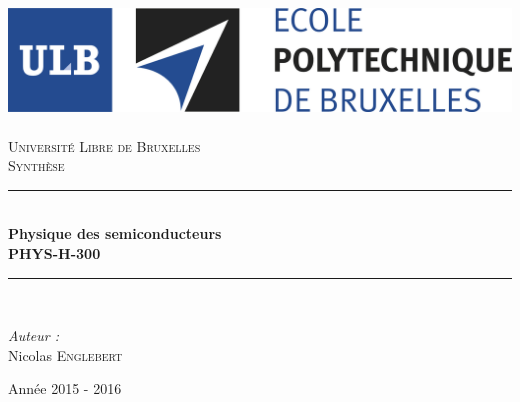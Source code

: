 \AddToShipoutPicture*{\BackgroundPic}
\begin{titlepage}
\begin{center}	
	
	\newcommand{\HRule}{\rule{\linewidth}{0.5mm}}   			            %
	\includegraphics[scale=0.11]{titlepage/logo.jpg}~\\[1cm]				%

	\textsc{\LARGE Université Libre de Bruxelles}\\[1.5cm]
	\textsc{\Large Synthèse}\\[0.5cm]

	\HRule \\[0.4cm]
	{ \huge \bfseries Physique des semiconducteurs \ \\PHYS-H-300 \\[0.4cm] }


	\HRule \\[1.5cm]
		\begin{minipage}{0.4\textwidth}
		\begin{flushleft} \large
		
		\emph{Auteur :}\\
			Nicolas \textsc{Englebert}

			\end{flushleft}
			\end{minipage}
			\begin{minipage}{0.4\textwidth}
			\begin{flushright} \large
			\end{flushright}
		\end{minipage}

	\vfill

{\large Année 2015 - 2016}

\end{center}
\end{titlepage}
